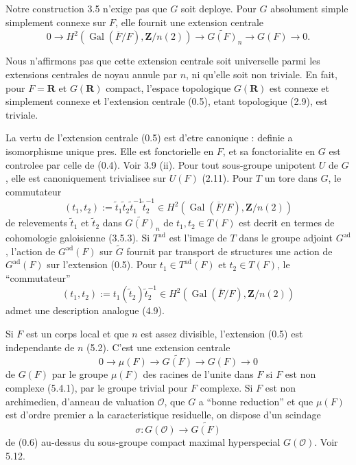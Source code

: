 \documentclass[11pt,a4paper]{article}
\theoremstyle{plain}
\theoremstyle{definition}
\DeclareMathOperator{\Gal}{Gal}
\DeclareMathOperator{\ad}{ad}
\begin{document}
Notre construction 3.5 n'exige pas que $G$ soit deploye. Pour $G$ absolument simple simplement connexe sur $F$, elle fournit une extension centrale
\begin{equation}\label{0.5}
0 \to H^2(\Gal(\overline{F}/F), \mathbf{Z}/n(2)) \to \widetilde{G(F)}_n \to G(F) \to 0.
\end{equation}

Nous n'affirmons pas que cette extension centrale soit universelle parmi les extensions centrales de noyau annule par $n$, ni qu'elle soit non triviale. En fait, pour $F = \mathbf{R}$ et $G(\mathbf{R})$ compact, l'espace topologique $G(\mathbf{R})$ est connexe et simplement connexe et l'extension centrale (0.5), etant topologique (2.9), est triviale.

La vertu de l'extension centrale (0.5) est d'etre canonique : definie a isomorphisme unique pres. Elle est fonctorielle en $F$, et sa fonctorialite en $G$ est controlee par celle de (0.4). Voir 3.9 (ii). Pour tout sous-groupe unipotent $U$ de $G$, elle est canoniquement trivialisee sur $U(F)$ (2.11). Pour $T$ un tore dans $G$, le commutateur
\[
(t_1, t_2) := \tilde{t}_1 \tilde{t}_2 \tilde{t}_1^{-1} \tilde{t}_2^{-1} \in H^2(\Gal(\overline{F}/F), \mathbf{Z}/n(2))
\]
de relevements $\tilde{t}_1$ et $\tilde{t}_2$ dans $\widetilde{G(F)}_n$ de $t_1, t_2 \in T(F)$ est decrit en termes de cohomologie galoisienne (3.5.3). Si $T^{\ad}$ est l'image de $T$ dans le groupe adjoint $G^{\ad}$, l'action de $G^{\ad}(F)$ sur $\widetilde{G}$ fournit par transport de structures une action de $G^{\ad}(F)$ sur l'extension (0.5). Pour $t_1 \in T^{\ad}(F)$ et $t_2 \in T(F)$, le ``commutateur''
\[
(t_1, t_2) := t_1(\tilde{t}_2) \tilde{t}_2^{-1} \in H^2(\Gal(\overline{F}/F), \mathbf{Z}/n(2))
\]
admet une description analogue (4.9).

Si $F$ est un corps local et que $n$ est assez divisible, l'extension (0.5) est independante de $n$ (5.2). C'est une extension centrale
\begin{equation}\label{0.6}
0 \to \mu(F) \to \widetilde{G(F)} \to G(F) \to 0
\end{equation}
de $G(F)$ par le groupe $\mu(F)$ des racines de l'unite dans $F$ si $F$ est non complexe (5.4.1), par le groupe trivial pour $F$ complexe. Si $F$ est non archimedien, d'anneau de valuation $\mathcal{O}$, que $G$ a ``bonne reduction'' et que $\mu(F)$ est d'ordre premier a la caracteristique residuelle, on dispose d'un scindage
\begin{equation}\label{0.7}
\sigma : G(\mathcal{O}) \to \widetilde{G(F)}
\end{equation}
de (0.6) au-dessus du sous-groupe compact maximal hyperspecial $G(\mathcal{O})$. Voir 5.12.
\end{document}
